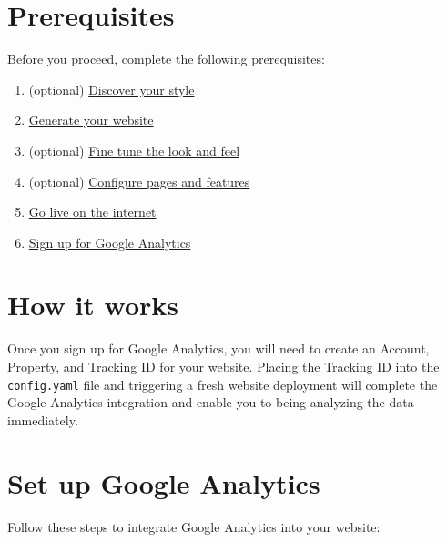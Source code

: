 \documentclass[
]{book}
\providecommand{\tightlist}{%
  \setlength{\itemsep}{0pt}\setlength{\parskip}{0pt}}
\begin{document}
\hypertarget{prerequisites-5}{%
\section{Prerequisites}\label{prerequisites-5}}

Before you proceed, complete the following prerequisites:

\begin{enumerate}
\def\labelenumi{\arabic{enumi}.}
\tightlist
\item
  (optional) \protect\hyperlink{choose-theme}{Discover your style}
\item
  \protect\hyperlink{generate}{Generate your website}
\item
  (optional) \protect\hyperlink{fine-tune}{Fine tune the look and feel}
\item
  (optional) \protect\hyperlink{pages-features}{Configure pages and features}
\item
  \protect\hyperlink{deploy}{Go live on the internet}
\item
  \href{https://analytics.google.com}{Sign up for Google Analytics}
\end{enumerate}

\hypertarget{how-it-works-5}{%
\section{How it works}\label{how-it-works-5}}

Once you sign up for Google Analytics, you will need to create an Account, Property, and Tracking ID for your website. Placing the Tracking ID into the \texttt{config.yaml} file and triggering a fresh website deployment will complete the Google Analytics integration and enable you to being analyzing the data immediately.

\hypertarget{ga-setup}{%
\section{Set up Google Analytics}\label{ga-setup}}

Follow these steps to integrate Google Analytics into your website:
\end{document}
